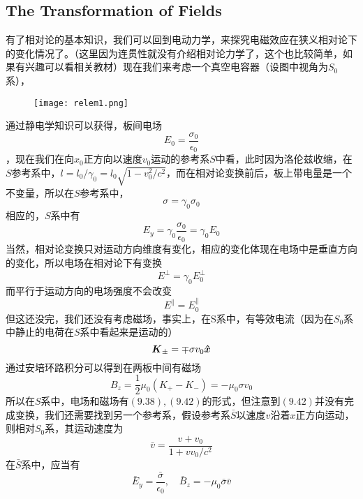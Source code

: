 \documentclass[14pt,oneside]{book}
\def \x{\vb*{\hat x}}
\begin{document}
\begin{large}
\subsection{The Transformation of Fields}
有了相对论的基本知识，我们可以回到电动力学，来探究电磁效应在狭义相对论下的变化情况了。（这里因为连贯性就没有介绍相对论力学了，这个也比较简单，如果有兴趣可以看相关教材）现在我们来考虑一个真空电容器（设图中视角为$S_0$系），
\begin{figure}[H]
\centering
  \texttt{[image: relem1.png]}
\end{figure}
通过静电学知识可以获得，板间电场
\begin{equation}
  E_0=\frac{\sigma_0}{\epsilon_0}
\end{equation}
，现在我们在向$x_0$正方向以速度$v_0$运动的参考系$S$中看，此时因为洛伦兹收缩，在$S$参考系中，$l=l_0/\gamma_0=l_0\sqrt{1-v_0^2/c^2}$，而在相对论变换前后，板上带电量是一个不变量，所以在$S$参考系中，
\begin{equation}
  \sigma=\gamma_0\sigma_0
\end{equation}
相应的，$S$系中有
\begin{equation}
  E_y=\gamma_0\frac{\sigma_0}{\epsilon_0}=\gamma_0E_0
\end{equation}
当然，相对论变换只对运动方向维度有变化，相应的变化体现在电场中是垂直方向的变化，所以电场在相对论下有变换
\begin{equation}
  E^\perp=\gamma_0 E_0^\perp
\end{equation}
而平行于运动方向的电场强度不会改变
\begin{equation}
  E^\parallel=E_0^\parallel
\end{equation}
但这还没完，我们还没有考虑磁场，事实上，在S系中，有等效电流（因为在$S_0$系中静止的电荷在$S$系中看起来是运动的）
\begin{equation}
  \vb*{K}_\pm=\mp \sigma v_0\vb*{\x} 
\end{equation}
通过安培环路积分可以得到在两板中间有磁场
\begin{equation}
  B_z=\frac{1}{2}\mu_0 (K_+-K_-)=-\mu_0\sigma v_0
\end{equation}
所以在$S$系中，电场和磁场有$(9.38),(9.42)$的形式，但注意到$(9.42)$并没有完成变换，我们还需要找到另一个参考系，假设参考系$\bar S$以速度$v$沿着$x$正方向运动，则相对$S_0$系，其运动速度为
\begin{equation}
  \bar v=\frac{v+v_0}{1+vv_0/c^2}
\end{equation}
在$\bar S$系中，应当有
\begin{equation}
  \bar E_y=\frac{\bar \sigma}{\epsilon_0},\quad\bar B_z = -\mu_0\bar \sigma\bar v

\end{equation}
\end{large}
\end{document}
